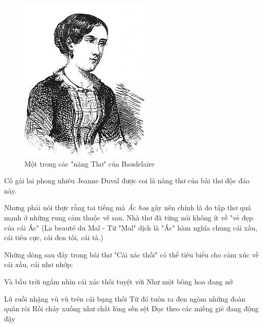 \documentclass[../main.tex]{subfiles}
\begin{document}
\begin{multicols}{2}
 
 \begin{figure}
	\centering
	\includegraphics[width=\textwidth]{../img/tho080708_3.jpg}
	\caption{Một trong các "nàng Thơ" của Baudelaire}
\end{figure}
 Cô gái lai phong nhiêu Jeanne Duval được coi là nàng thơ của bài thơ độc đáo này. 
 
Nhưng phải nói thực rằng tai tiếng mà \textit{Ác hoa} gây nên chính là do tập thơ quá mạnh ở những rung cảm thuộc vế sau. Nhà thơ đã từng nói không ít về "vẻ đẹp của cái Ác" (La beauté du Mal - Từ "Mal"  dịch là "Ác" hàm nghĩa chung cái xấu, cái tiêu cực, cái đen tối, cái tà.) 
 
Những dòng sau đây trong bài thơ "Cái xác thối" có thể tiêu biểu cho cảm xúc về cái xấu, cái nhơ nhớp: 
\begin{blockquote}
        
Và bầu trời ngắm nhìn cái xác thối tuyệt vời        
Như một bông hoa đang nở 
        
Lũ ruồi nhặng vù vù trên cái bụng thối        
Từ đó tuôn ra đen ngòm những đoàn quân ròi        
Rồi chảy xuống như chất lỏng sền sệt        
Dọc theo các miếng giẻ đang động đậy 
        

\end{blockquote}
\end{multicols}
\end{document}
